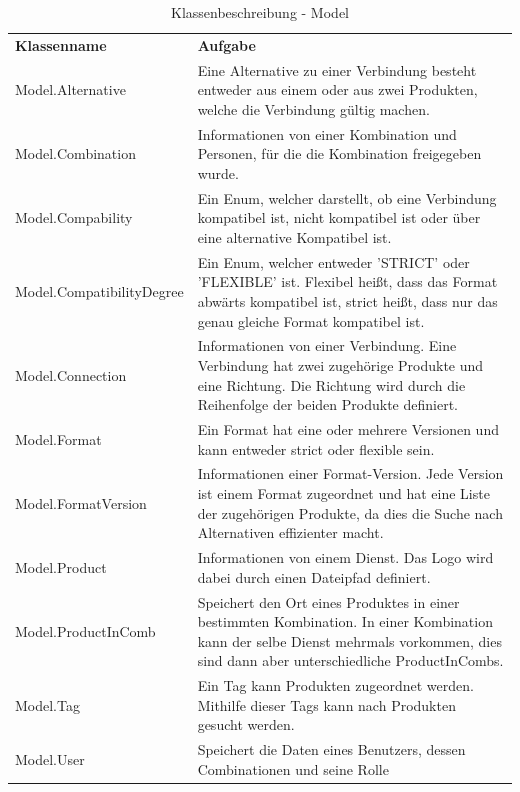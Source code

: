 \begin{table}[h]
	\centering

	\begin{tabularx}{\textwidth}{X X}
		\rowcolor[HTML]{C0C0C0}
		\textbf{Klassenname} & \textbf{Aufgabe} \\
		Model.Alternative & Eine Alternative zu einer Verbindung besteht entweder aus einem oder aus zwei Produkten, welche die Verbindung gültig machen. \\
    	\rowcolor[HTML]{E7E7E7}
    	Model.Combination & Informationen von einer Kombination und Personen, für die die Kombination freigegeben wurde. \\
		Model.Compability  &  Ein Enum, welcher darstellt, ob eine Verbindung kompatibel ist, nicht kompatibel ist oder über eine alternative Kompatibel ist. \\
    	\rowcolor[HTML]{E7E7E7}
		Model.CompatibilityDegree & Ein Enum, welcher entweder 'STRICT' oder 'FLEXIBLE' ist.
		Flexibel heißt, dass das Format abwärts kompatibel ist, strict heißt, dass nur das genau gleiche Format kompatibel ist.\\
		Model.Connection  & Informationen von einer Verbindung. Eine Verbindung hat zwei zugehörige Produkte und eine Richtung.
		Die Richtung wird durch die Reihenfolge der beiden Produkte definiert. \\
    	\rowcolor[HTML]{E7E7E7}
		Model.Format & Ein Format hat eine oder mehrere Versionen und kann entweder strict oder flexible sein. \\
		Model.FormatVersion  & Informationen einer Format-Version.
		Jede Version ist einem Format zugeordnet und hat eine Liste der zugehörigen Produkte, da dies die Suche nach Alternativen effizienter macht.\\
    	\rowcolor[HTML]{E7E7E7}
    	Model.Product & Informationen von einem Dienst.
    	Das Logo wird dabei durch einen Dateipfad definiert. \\
		Model.ProductInComb & Speichert den Ort eines Produktes in einer bestimmten Kombination.
		In einer Kombination kann der selbe Dienst mehrmals vorkommen, dies sind dann aber unterschiedliche ProductInCombs. \\
    	\rowcolor[HTML]{E7E7E7}
		Model.Tag & Ein Tag kann Produkten zugeordnet werden.
		Mithilfe dieser Tags kann nach Produkten gesucht werden. \\
		Model.User & Speichert die Daten eines Benutzers, dessen Combinationen und seine Rolle \\
	\end{tabularx}
	\caption{Klassenbeschreibung - Model}
	\label{table:klassenbeschreibung-model}
\end{table}


